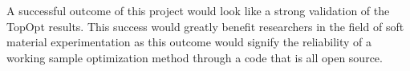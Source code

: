 A successful outcome of this project would look like a strong validation of the TopOpt results. This success would greatly benefit researchers in the field of soft material experimentation as this outcome would signify the reliability of a working sample optimization method through a code that is all open source.



